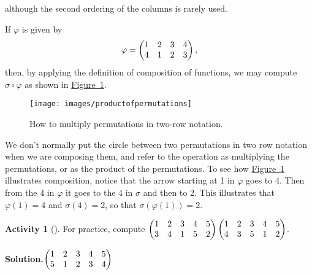 \documentclass[10pt,]{book}
\theoremstyle{plain}
\theoremstyle{definition}
\newtheorem{activity}[project]{Activity}
\numberwithin{equation}{chapter}
\newcommand{\amp}{&}
\begin{document}
although the second ordering of the columns is rarely used.%
\par
If \(\varphi\) is given by%
\begin{equation*}
\varphi = \begin{pmatrix}1\amp 2\amp 3\amp 4\cr4\amp 1\amp 2\amp 3
\end{pmatrix} ,
\end{equation*}
then, by applying the definition of composition of functions, we may compute \(\sigma\circ
\varphi\) as shown in \hyperref[permutationproduct]{Figure~\ref{permutationproduct}}.%
\begin{figure}
\centering
\texttt{[image: images/productofpermutations]}
\caption{How to multiply permutations in two-row notation.\label{permutationproduct}}
\end{figure}
We don't normally put the circle between two permutations in two row notation when we are composing them, and refer to the operation as multiplying the permutations, or as the product of the permutations. To see how \hyperref[permutationproduct]{Figure~\ref{permutationproduct}} illustrates composition, notice that the arrow starting at 1 in \(\varphi\) goes to 4. Then from the 4 in \(\varphi\) it goes to the 4 in \(\sigma\) and then to 2. This illustrates that \(\varphi(1)=4\) and \(\sigma(4) =2\), so that \(\sigma(\varphi(1))=2\).%
\begin{activity}[]\label{activity-261}
For practice, compute \(\begin{pmatrix}1\amp 2\amp 3\amp 4\amp 5\cr3\amp 4\amp 1\amp 5\amp 2
\end{pmatrix}
\begin{pmatrix}1\amp 2\amp 3\amp 4\amp 5\cr 4\amp 3\amp 5\amp 1\amp 2
\end{pmatrix}\).%
\par\medskip\noindent%
\textbf{Solution.}\quad \(\begin{pmatrix}1\amp 2\amp 3\amp 4\amp 5\cr5\amp 1\amp 2\amp 3\amp 4
\end{pmatrix}\)%
\end{activity}
\typeout{************************************************}
\typeout{************************************************}
\end{document}
